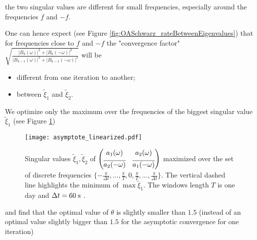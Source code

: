 the two singular values are different for small frequencies,
especially around the frequencies $f$ and $-f$.
\par
One can hence expect (see
Figure \ref{fig:OASchwarz_rateBetweenEigenvalues}) that for frequencies close to $f$ and $-f$
the "convergence factor"
$\sqrt{\frac{|B_k(\omega)|^2 +
|B_k(-\omega)|^2}{|B_{k-1}(\omega)|^2 + |B_{k-1}(-\omega)|^2}}$ will be
\begin{itemize}
	\item different from one iteration to another;
	\item between $\widetilde{\xi}_1$ and $\widetilde{\xi}_2$.
\end{itemize}
We optimize only the maximum over the frequencies of the biggest
singular value $\widetilde{\xi}_1$ (see Figure
\ref{fig:OASchwarz_nonasymptotic})
\begin{figure}
    \centering
    \texttt{[image: asymptote\_linearized.pdf]}
	\caption{Singular values
	$\widetilde{\xi}_1, \widetilde{\xi}_2$ of $\begin{pmatrix}
	a_1(\omega) & a_2(\omega) \vspace{0.15cm}\\
	\overline{a_2(-\omega)} & \overline{a_1(-\omega)} \\
	\end{pmatrix}$ maximized over the set of discrete
	frequencies
	$\{-\frac{\pi}{\Delta t}, ..., \frac{\pi}{T}, 0,
	\frac{\pi}{T},..., \frac{\pi}{\Delta t}\}$.
	The vertical dashed line highlights the minimum
	of $\max \widetilde{\xi}_1$.
	The windows length $T$ is one day
	and $\Delta t=60\;{\rm s}$ .
	}
    \label{fig:OASchwarz_nonasymptotic}
\end{figure}
and find that the optimal value of $\theta$ is slightly smaller than
$1.5$ (instead of an optimal value slightly bigger than $1.5$
for the asymptotic convergence for one iteration)
